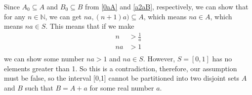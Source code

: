 \documentclass[12pt]{article}
\begin{document}
\begin{framed}
\end{framed}

Since $A_0 \subseteq A$ and $B_0 \subseteq B$ from \eqref{0aA} and \eqref{a2aB}, respectively, we can show that for any $n \in \mathbb{N}$, we can get $na, (n+1)a) \subseteq A$, which means $na \in A$, which means $na \in S$. This means that if we make
\begin{align*}
    n &> \frac{1}{a} \\
    na &> 1 \\
\end{align*}
we can show some number $na > 1$ and $na \in S$. However, $S=[0,1]$ has no elements greater than 1. So this is a contradiction, therefore, our assumption must be false, so the interval [0,1] cannot be partitioned into two disjoint sets $A$ and $B$ such that $B = A + a$ for some real number $a$.
\end{document}
